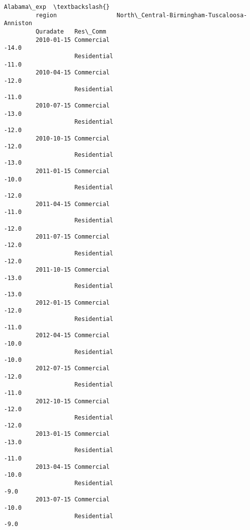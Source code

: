 \documentclass[11pt]{article}
\begin{document}
\begin{Verbatim}[commandchars=\\\{\}]
                                                                 Alabama\_exp  \textbackslash{}
         region                 North\_Central-Birmingham-Tuscaloosa-Anniston   
         Quradate   Res\_Comm                                                   
         2010-01-15 Commercial                                         -14.0   
                    Residential                                        -11.0   
         2010-04-15 Commercial                                         -12.0   
                    Residential                                        -11.0   
         2010-07-15 Commercial                                         -13.0   
                    Residential                                        -12.0   
         2010-10-15 Commercial                                         -12.0   
                    Residential                                        -13.0   
         2011-01-15 Commercial                                         -10.0   
                    Residential                                        -12.0   
         2011-04-15 Commercial                                         -11.0   
                    Residential                                        -12.0   
         2011-07-15 Commercial                                         -12.0   
                    Residential                                        -12.0   
         2011-10-15 Commercial                                         -13.0   
                    Residential                                        -13.0   
         2012-01-15 Commercial                                         -12.0   
                    Residential                                        -11.0   
         2012-04-15 Commercial                                         -10.0   
                    Residential                                        -10.0   
         2012-07-15 Commercial                                         -12.0   
                    Residential                                        -11.0   
         2012-10-15 Commercial                                         -12.0   
                    Residential                                        -12.0   
         2013-01-15 Commercial                                         -13.0   
                    Residential                                        -11.0   
         2013-04-15 Commercial                                         -10.0   
                    Residential                                         -9.0   
         2013-07-15 Commercial                                         -10.0   
                    Residential                                         -9.0   

\end{Verbatim}
\end{document}
